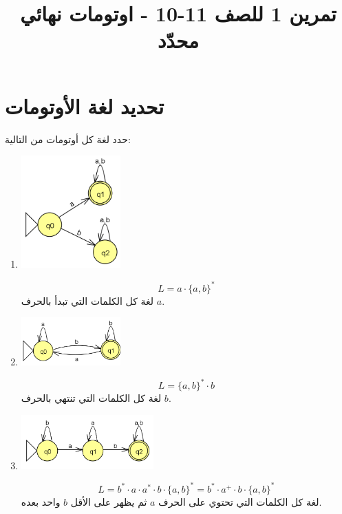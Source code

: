 ﻿\documentclass[12pt]{article}
\title{تمرين 1 للصف 11-10 - اوتومات نهائي محدّد}
\begin{document}
\maketitle

\section{تحديد لغة الأوتومات}

حدد لغة كل أوتومات من التالية:

\ifwithsols
\begin{enumerate}[itemsep=3em]
\else
\begin{enumerate}
\fi

\item
\includegraphics[width=0.3\textwidth]{../../../images/DFAs/ex1_q1.png}\\
\ifwithsols
\begin{boxSolution}
\[ L = a \cdot \{a,b\}^* \]
لغة كل الكلمات التي تبدأ بالحرف $a$.
\end{boxSolution}
\fi

\item
\includegraphics[width=0.3\textwidth]{../../../images/DFAs/ex1_q2.png}\\
\ifwithsols
\begin{boxSolution}
    \[ L = \{a,b\}^* \cdot b \]
    لغة كل الكلمات التي تنتهي بالحرف $b$.
\end{boxSolution}
\clearpage
\fi

\item
\includegraphics[width=0.4\textwidth]{../../../images/DFAs/ex1_q3.png}\\
\ifwithsols
\begin{boxSolution}
\[ L = b^* \cdot a \cdot a^* \cdot b \cdot \{a, b \}^* = b^* \cdot a^+ \cdot b \cdot \{a,b\}^* \]
لغة كل الكلمات التي تحتوي على الحرف $a$ ثم يظهر على الأقل $b$ واحد بعده.
\end{boxSolution}
\fi


\end{enumerate}
\end{enumerate}
\end{document}
